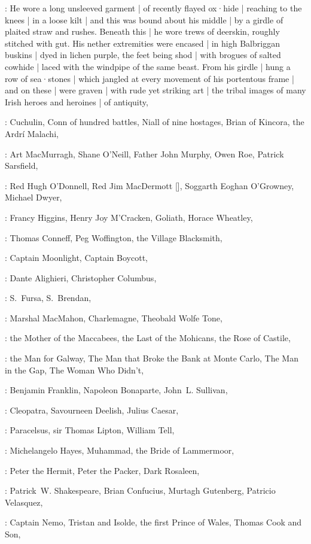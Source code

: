 :
He wore a long unsleeved garment |
of recently flayed ox·hide |
reaching to the knees |
in a loose kilt |
and this was bound about his middle |
by a girdle of plaited straw and rushes.
Beneath this |
he wore trews of deerskin,
roughly stitched with gut.
His nether extremities were encased |
in high Balbriggan buskins |
dyed in lichen purple,
the feet being shod |
with brogues of salted cowhide |
laced with the windpipe of the same beast.
From his girdle |
hung a row of sea·stones |
which jangled at every movement of his portentous frame |
and on these |
were graven |
with rude yet striking art |
the tribal images of many Irish heroes and heroines |
of antiquity,

:
Cuchulin,
Conn of hundred battles,
Niall of nine hostages,
Brian of Kincora,
the Ardrí Malachi,

:
Art MacMurragh,
Shane O'Neill,
Father John Murphy,
Owen Roe,
Patrick Sarsfield,

:
Red Hugh O'Donnell,
Red Jim MacDermott
[],
Soggarth Eoghan O'Grow\-ney,
Michael Dwyer,

:
Francy Higgins,
Henry Joy M'Cracken,
Goliath,
Horace Wheatley,

:
Thomas Conneff,
Peg Woffington,
the Village Blacksmith,

:
Captain Moonlight,
Captain Boycott,

:
Dante Alighieri,
Christopher Columbus,

:
S.~Fursa,
S.~Brendan,

:
Marshal MacMahon,
Charlemagne,
Theobald Wolfe Tone,

:
the Mother of the Maccabees,
the Last of the Mohicans,
the Rose of Castile,

:
the Man for Galway,
The Man that Broke the Bank at Monte Carlo,
The Man in the Gap,
The Woman Who Didn't,

:
Benjamin Franklin,
Napoleon Bonaparte,
John~L. Sullivan,

:
Cleopatra,
Savourneen Deelish,
Julius Caesar,

:
Paracelsus,
sir Thomas Lipton,
William Tell,

:
Michelangelo Hayes,
Muhammad,
the Bride of Lammermoor,

:
Peter the Hermit,
Peter the Packer,
Dark Rosaleen,

:
Patrick~W. Shakespeare,
Brian Confucius,
Murtagh Gutenberg,
Patricio Velasquez,

:
Captain Nemo,
Tristan and Isolde,
the first Prince of Wales,
Thomas Cook and Son,

